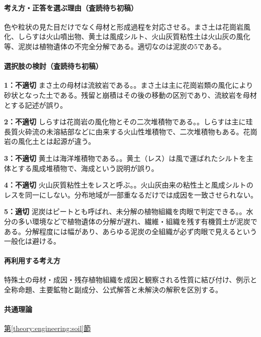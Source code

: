 \paragraph{考え方・正答を選ぶ理由（査読待ち初稿）} 色や粒状の見た目だけでなく母材と形成過程を対応させる。まさ土は花崗岩風化、しらすは火山噴出物、黄土は風成シルト、火山灰質粘性土は火山灰の風化等、泥炭は植物遺体の不完全分解である。適切なのは泥炭の5である。

\paragraph{選択肢の検討（査読待ち初稿）}\mbox{}\par

\noindent\textbf{1：不適切} まさ土の母材は流紋岩である。。まさ土は主に花崗岩類の風化により砂状となった土である。残留と崩積はその後の移動の区別であり、流紋岩を母材とする記述が誤り。\par

\noindent\textbf{2：不適切} しらすは花崗岩の風化物とその二次堆積物である。。しらすは主に珪長質火砕流の未溶結部などに由来する火山性堆積物で、二次堆積物もある。花崗岩の風化土とは起源が違う。\par

\noindent\textbf{3：不適切} 黄土は海洋堆積物である。。黄土（レス）は風で運ばれたシルトを主体とする風成堆積物で、海成という説明が誤り。\par

\noindent\textbf{4：不適切} 火山灰質粘性土をレスと呼ぶ。。火山灰由来の粘性土と風成シルトのレスを同一にしない。分布地域が一部重なるだけでは成因を一致させられない。\par

\noindent\textbf{5：適切} 泥炭はピートとも呼ばれ、未分解の植物組織を肉眼で判定できる。。水分の多い環境などで植物遺体の分解が遅れ、繊維・組織を残す有機質土が泥炭である。分解程度には幅があり、あらゆる泥炭の全組織が必ず肉眼で見えるという一般化は避ける。\par

\paragraph{再利用する考え方} 特殊土の母材・成因・残存植物組織を成因と観察される性質に結び付け、例示と全称命題、主要鉱物と副成分、公式解答と未解決の解釈を区別する。

\paragraph{共通理論} \hyperref[theory:engineering:soil]{第\ref*{theory:engineering:soil}節}

